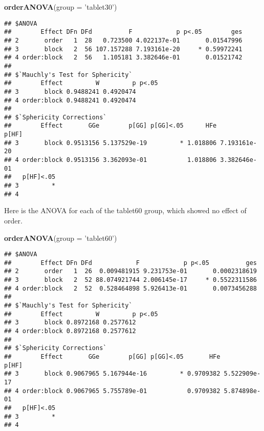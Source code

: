 \documentclass[]{article}
\newenvironment{Shaded}{\begin{snugshade}}{\end{snugshade}}
\newcommand{\KeywordTok}[1]{\textcolor[rgb]{0.13,0.29,0.53}{\textbf{#1}}}
\newcommand{\DataTypeTok}[1]{\textcolor[rgb]{0.13,0.29,0.53}{#1}}
\newcommand{\StringTok}[1]{\textcolor[rgb]{0.31,0.60,0.02}{#1}}
\newcommand{\NormalTok}[1]{#1}
\begin{document}
\begin{Shaded}
\begin{Highlighting}[]
\KeywordTok{orderANOVA}\NormalTok{(}\DataTypeTok{group =} \StringTok{'tablet30'}\NormalTok{)}
\end{Highlighting}
\end{Shaded}

\begin{verbatim}
## $ANOVA
##        Effect DFn DFd          F            p p<.05        ges
## 2       order   1  28   0.723500 4.022137e-01       0.01547996
## 3       block   2  56 107.157288 7.193161e-20     * 0.59972241
## 4 order:block   2  56   1.105181 3.382646e-01       0.01521742
## 
## $`Mauchly's Test for Sphericity`
##        Effect         W         p p<.05
## 3       block 0.9488241 0.4920474      
## 4 order:block 0.9488241 0.4920474      
## 
## $`Sphericity Corrections`
##        Effect       GGe        p[GG] p[GG]<.05      HFe        p[HF]
## 3       block 0.9513156 5.137529e-19         * 1.018806 7.193161e-20
## 4 order:block 0.9513156 3.362093e-01           1.018806 3.382646e-01
##   p[HF]<.05
## 3         *
## 4
\end{verbatim}

Here is the ANOVA for each of the tablet60 group, which showed no effect
of order.

\begin{Shaded}
\begin{Highlighting}[]
\KeywordTok{orderANOVA}\NormalTok{(}\DataTypeTok{group =} \StringTok{'tablet60'}\NormalTok{)}
\end{Highlighting}
\end{Shaded}

\begin{verbatim}
## $ANOVA
##        Effect DFn DFd            F            p p<.05          ges
## 2       order   1  26  0.009481915 9.231753e-01       0.0002318619
## 3       block   2  52 88.074921744 2.006145e-17     * 0.5522311586
## 4 order:block   2  52  0.528464898 5.926413e-01       0.0073456288
## 
## $`Mauchly's Test for Sphericity`
##        Effect         W         p p<.05
## 3       block 0.8972168 0.2577612      
## 4 order:block 0.8972168 0.2577612      
## 
## $`Sphericity Corrections`
##        Effect       GGe        p[GG] p[GG]<.05       HFe        p[HF]
## 3       block 0.9067965 5.167944e-16         * 0.9709382 5.522909e-17
## 4 order:block 0.9067965 5.755789e-01           0.9709382 5.874898e-01
##   p[HF]<.05
## 3         *
## 4
\end{verbatim}
\end{document}
